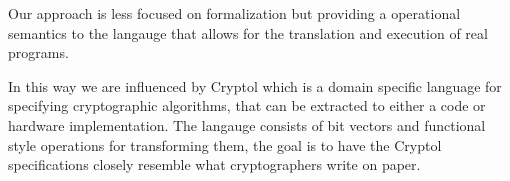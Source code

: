 Our approach is less focused on formalization but providing a operational
semantics to the langauge that allows for the translation and execution of
real programs.

In this way we are influenced by Cryptol\cite{cryptol2010} which is a domain specific language
for specifying cryptographic algorithms, that can be extracted to either a
code or hardware implementation. The langauge consists of bit vectors and
functional style operations for transforming them, the goal is to have
the Cryptol specifications closely resemble what cryptographers write on paper.
